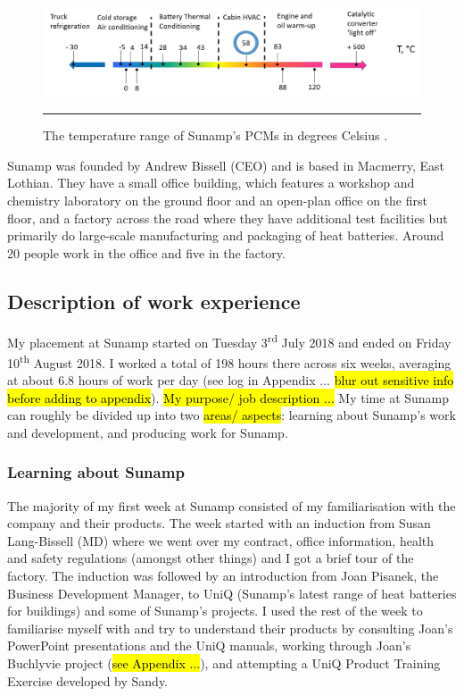 \begin{figure}[htbp]
	\centering
	\includegraphics[width=\textwidth]{figures/temperature-range-of-PCMs.jpg}
	\rule{\textwidth}{0.5pt} %
	\caption{The temperature range of Sunamp's PCMs in degrees Celsius \citep{SunampAutomotive}.}
	\label{pcm_temp_range}
\end{figure}

Sunamp was founded by Andrew Bissell (CEO) and is based in Macmerry, East Lothian.
They have a small office building, which features a workshop and chemistry laboratory on the ground floor and an open-plan office on the first floor, and a factory across the road where they have additional test facilities but primarily do large-scale manufacturing and packaging of heat batteries.
Around 20 people work in the office and five in the factory.



\subsection{Description of work experience}

My placement at Sunamp started on Tuesday 3\textsuperscript{rd} July 2018 and ended on Friday 10\textsuperscript{th} August 2018.
I worked a total of 198 hours there across six weeks, averaging at about 6.8 hours of work per day (see log in Appendix ... \hl{blur out sensitive info before adding to appendix}).
\hl{My purpose/ job description ...}
My time at Sunamp can roughly be divided up into two \hl{areas/ aspects}: learning about Sunamp's work and development, and producing work for Sunamp.


\subsubsection{Learning about Sunamp}

The majority of my first week at Sunamp consisted of my familiarisation with the company and their products.
The week started with an induction from Susan Lang-Bissell (MD) where we went over my contract, office information, health and safety regulations (amongst other things) and I got a brief tour of the factory.
The induction was followed by an introduction from Joan Pisanek, the Business Development Manager, to UniQ (Sunamp's latest range of heat batteries for buildings) and some of Sunamp's projects.
I used the rest of the week to familiarise myself with and try to understand their products by consulting Joan's PowerPoint presentations and the UniQ manuals, working through Joan's Buchlyvie project (\hl{see Appendix ...}), and attempting a UniQ Product Training Exercise developed by Sandy.

